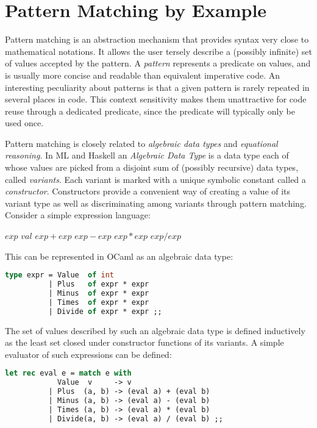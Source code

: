 \section{Pattern Matching by Example} %
\label{sec:bg}

Pattern matching is an abstraction mechanism that provides syntax very close to 
mathematical notations. It allows the user tersely describe a (possibly 
infinite) set of values accepted by the pattern. A \emph{pattern} represents a 
predicate on values, and is usually more concise and readable than equivalent 
imperative code. An interesting peculiarity about patterns is that a given 
pattern is rarely repeated in several places in code. This context sensitivity 
makes them unattractive for code reuse through a dedicated predicate, since the 
predicate will typically only be used once.

Pattern matching is closely related to \emph{algebraic data types} and 
\emph{equational reasoning}. In ML and Haskell an \emph{Algebraic Data Type} is 
a data type each of whose values are picked from a disjoint sum of (possibly 
recursive) data types, called \emph{variants}. Each variant is marked with a 
unique symbolic constant called a \emph{constructor}. Constructors provide a 
convenient way of creating a value of its variant type as well as discriminating 
among variants through pattern matching. Consider a simple expression language:
\begin{center}
$exp$ \is{} $val$ \Alt{} $exp+exp$ \Alt{} $exp-exp$ \Alt{} $exp*exp$ \Alt{} $exp/exp$
\end{center}

\noindent
This can be represented in OCaml as an algebraic data type:

\begin{lstlisting}[language=Caml,keepspaces,columns=flexible]
type expr = Value  of int 
          | Plus   of expr * expr 
          | Minus  of expr * expr 
          | Times  of expr * expr 
          | Divide of expr * expr ;;
\end{lstlisting}

\noindent
The set of values described by such an algebraic data type is defined 
inductively as the least set closed under constructor functions of its variants.
A simple evaluator of such expressions can be defined:

\begin{lstlisting}[language=Caml,keepspaces,columns=flexible]
let rec eval e = match e with 
            Value  v     -> v 
          | Plus  (a, b) -> (eval a) + (eval b) 
          | Minus (a, b) -> (eval a) - (eval b)
          | Times (a, b) -> (eval a) * (eval b) 
          | Divide(a, b) -> (eval a) / (eval b) ;;
\end{lstlisting}

